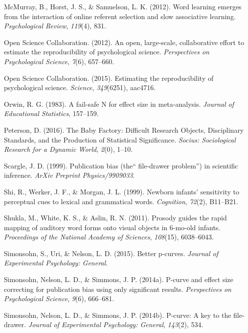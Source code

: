 \documentclass[english,floatsintext,man]{apa6}
\begin{document}
\hypertarget{ref-mcmurray2012word}{}
McMurray, B., Horst, J. S., \& Samuelson, L. K. (2012). Word learning
emerges from the interaction of online referent selection and slow
associative learning. \emph{Psychological Review}, \emph{119}(4), 831.

\hypertarget{ref-open2012open}{}
Open Science Collaboration. (2012). An open, large-scale, collaborative
effort to estimate the reproducibility of psychological science.
\emph{Perspectives on Psychological Science}, \emph{7}(6), 657--660.

\hypertarget{ref-open2015estimating}{}
Open Science Collaboration. (2015). Estimating the reproducibility of
psychological science. \emph{Science}, \emph{349}(6251), aac4716.

\hypertarget{ref-orwin1983fail}{}
Orwin, R. G. (1983). A fail-safe N for effect size in meta-analysis.
\emph{Journal of Educational Statistics}, 157--159.

\hypertarget{ref-Peterson:2016}{}
Peterson, D. (2016). The Baby Factory: Difficult Research Objects,
Disciplinary Standards, and the Production of Statistical Significance.
\emph{Socius: Sociological Research for a Dynamic World}, \emph{2}(0),
1--10.

\hypertarget{ref-scargle1999publication}{}
Scargle, J. D. (1999). Publication bias (the`` file-drawer problem'') in
scientific inference. \emph{ArXiv Preprint Physics/9909033}.

\hypertarget{ref-shi1999newborn}{}
Shi, R., Werker, J. F., \& Morgan, J. L. (1999). Newborn infants'
sensitivity to perceptual cues to lexical and grammatical words.
\emph{Cognition}, \emph{72}(2), B11--B21.

\hypertarget{ref-shukla2011prosody}{}
Shukla, M., White, K. S., \& Aslin, R. N. (2011). Prosody guides the
rapid mapping of auditory word forms onto visual objects in 6-mo-old
infants. \emph{Proceedings of the National Academy of Sciences},
\emph{108}(15), 6038--6043.

\hypertarget{ref-simonsohn2015better}{}
Simonsohn, S., Uri, \& Nelson, L. D. (2015). Better p-curves.
\emph{Journal of Experimental Psychology: General}.

\hypertarget{ref-simonsohn2014power}{}
Simonsohn, Nelson, L. D., \& Simmons, J. P. (2014a). P-curve and effect
size correcting for publication bias using only significant results.
\emph{Perspectives on Psychological Science}, \emph{9}(6), 666--681.

\hypertarget{ref-simonsohn2014p}{}
Simonsohn, Nelson, L. D., \& Simmons, J. P. (2014b). P-curve: A key to
the file-drawer. \emph{Journal of Experimental Psychology: General},
\emph{143}(2), 534.
\end{document}
